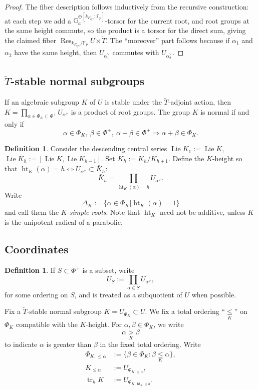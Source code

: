 \documentclass[11pt]{amsart}
\newcommand{\MINOREDITED}[1]{#1}
\theoremstyle{definition}
\newtheorem{defn}[thm]{Definition}
\newcommand{\G}{\mathbb{G}}
\newcommand{\F}{\mathbb{F}}
\newcommand{\leK}{\underset{K}{\le}}
\newcommand{\bT}{\breve{T}}
\newcommand{\cyc}{{\operatorname{cyc}}}
\DeclareMathOperator{\Ht}{ht}
\DeclareMathOperator{\Lie}{Lie}
\DeclareMathOperator{\tr}{tr}
\DeclareMathOperator{\Res}{Res}
\begin{document}
\begin{proof}
The fiber description follows inductively from the
recursive construction: at each step we add a
$\G_a^{\oplus [k_{F_{\cyc}}:\F_p]}$-torsor for the current
root, and root groups at the same height commute,
so the product is a torsor for the direct sum,
giving the claimed fiber $\Res_{k_{F_{\cyc}}/\F_p}U\rtimes\bT$.
The ``moreover'' part follows because if $\alpha_1$ and $\alpha_2$
have the same height, then $U_{\alpha_1^\vee}$ commutes
with $U_{\alpha_2^\vee}$.
\end{proof}

\subsection{$\bT$-stable normal subgroups}

If \MINOREDITED{an} algebraic subgroup $K$ of $U$
is stable under the $\bT$-adjoint action,
then $K=\prod_{\alpha\in \Phi_K\subset \Phi^+}U_{\alpha^\vee}$
is a product of root groups.
The group $K$
is normal if and only if 
\[
\alpha\in\Phi_K,\ \beta\in\Phi^+,\ \alpha+\beta\in \Phi^+
\Rightarrow\alpha+\beta\in \Phi_K.
\]



\begin{defn}
Consider the descending central series
$\Lie K_1:=\Lie K$,
$\Lie K_h:=[\Lie K, \Lie K_{h-1}]$.
Set $\bar K_h:=K_h/K_{h+1}$.
Define the $K$-height so that
$\Ht_K(\alpha)=h
\Leftrightarrow
U_{\alpha^{\vee}}\subset \bar K_h$:
\[
\bar K_h = \MINOREDITED{\prod}_{\Ht_K(\alpha)=h} U_{\alpha^\vee}.
\]
Write 
\[
\Delta_K := \{\alpha\in \Phi_K|\Ht_K(\alpha)=1\}
\]
and call them the {\it $K$-simple roots}.
Note that $\Ht_K$ \MINOREDITED{need not be} additive,
unless $K$ is the unipotent radical of a parabolic.
\end{defn}

\subsection{Coordinates}

\label{subsec:nonab}

\begin{defn}
If $S\subset \Phi^+$ is a subset,
write
\[
U_{S}:=\prod_{\alpha\in S}U_{\alpha^\vee},
\]
for some ordering on $S$,
and is treated as a subquotient of $U$ when possible.

Fix a $\bT$-stable normal subgroup $K=U_{\Phi_K}\subset U$.
We fix a total ordering ``$\leK$'' on $\Phi_K$
compatible with the $K$-height.
For $\alpha, \beta\in \Phi_K$,
we write
\[
\alpha \underset{K}{>} \beta
\]
to indicate $\alpha$ is greater
than $\beta$ in the fixed total ordering.
Write
\begin{align*}
\Phi_{K, \le \alpha} &:=\{\beta\in\Phi_{K}:\beta \leK \alpha\},
\\
K_{\le \alpha}&:=U_{\Phi_{K, \le \alpha}},
\\
\tr_{h}K &:= U_{\Phi_{K, \Ht_K\le h}}.
\end{align*}
\end{defn}
\end{document}
